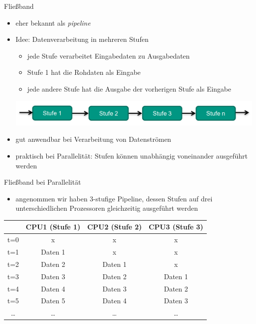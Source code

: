 \documentclass[18pt]{beamer}
\begin{document}
\begin{frame}{Fließband}
	\begin{itemize}
		\item eher bekannt als \emph{pipeline}
		\item Idee: Datenverarbeitung in mehreren Stufen
		\begin{itemize}
			\item jede Stufe verarbeitet Eingabedaten zu Ausgabedaten
			\item Stufe 1 hat die Rohdaten als Eingabe
			\item jede andere Stufe hat die Ausgabe der vorherigen Stufe als Eingabe
		\end{itemize}
		\centering	\includegraphics[scale=0.35]{pics/tut3/pipeline.png}
	\end{itemize}
		\pause
		\begin{itemize}
			\item gut anwendbar bei Verarbeitung von Datenströmen
			\item praktisch bei Parallelität: Stufen können unabhängig voneinander ausgeführt werden
		\end{itemize}
\end{frame}

\begin{frame}{Fließband bei Parallelität}
	\begin{itemize}
		\item angenommen wir haben 3-stufige Pipeline, dessen Stufen auf drei unterschiedlichen Prozessoren gleichzeitig ausgeführt werden
	\end{itemize}
	\begin{table}
		\begin{tabular}{c|c|c|c|}
				& CPU1 (Stufe 1) & CPU2 (Stufe 2) & CPU3 (Stufe 3) \\
				\hline
				t=0 & x & x & x \\
				\hline
			t=1 & Daten 1 & x & x \\
			\hline
			t=2 & Daten 2 & Daten 1 & x \\
			\hline
			t=3 & Daten 3 & Daten 2 & Daten 1 \\
			\hline
			t=4 & Daten 4 & Daten 3 & Daten 2 \\
			\hline
			t=5 & Daten 5 & Daten 4 & Daten 3 \\
			\dots & \dots & \dots & \dots 
		\end{tabular}
	\end{table}
\end{frame}
\end{document}
